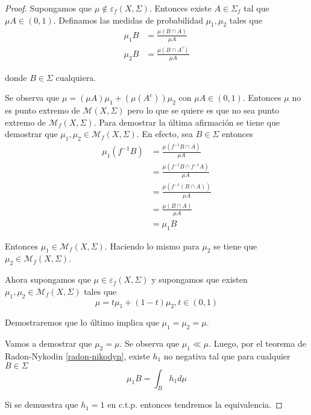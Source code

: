 \begin{proof}
	Supongamos que $\mu \notin \varepsilon_f(X,\Sigma)$. Entonces existe $A \in \Sigma_f$ tal que $\mu A \in (0,1)$. Definamos las medidas de probabilidad $\mu_1,\mu_2$ tales que
	\begin{align}
		\mu_1 B &= \frac{\mu(B \cap A)}{\mu A}\\
		\mu_2 B &= \frac{\mu(B \cap A^c)}{\mu A}
	\end{align}
	
	donde $B \in \Sigma$ cualquiera.
	
	Se observa que $\mu = (\mu A) \mu_1 + (\mu(A^c)) \mu_2$ con $\mu A \in (0,1)$. Entonces $\mu$ no es punto extremo de $\mathcal{M}(X,\Sigma)$ pero lo que se quiere es que no sea punto extremo de $\mathcal{M}_f(X,\Sigma)$. Para demostrar la última afirmación se tiene que demostrar que $\mu_1,\mu_2 \in \mathcal{M}_f(X,\Sigma)$. En efecto, sea $B \in \Sigma$ entonces
	\begin{align}
		\mu_1(f^{-1}B) &= \frac{\mu(f^{-1}B \cap A)}{\mu A}\\
		&= \frac{\mu(f^{-1}B \cap f^{-1}A)}{\mu A}\\
		&= \frac{\mu(f^{-1}(B \cap A))}{\mu A}\\
		&= \frac{\mu (B \cap A)}{\mu A}\\		
		&= \mu_1 B
	\end{align}
	
	Entonces $\mu_1 \in \mathcal{M}_f(X,\Sigma)$. Haciendo lo mismo para $\mu_2$ se tiene que\\
	$\mu_2 \in \mathcal{M}_f(X,\Sigma)$.
	
	Ahora supongamos que $\mu \in \varepsilon_f(X,\Sigma)$ y supongamos que existen\\
	$\mu_1,\mu_2 \in \mathcal{M}_f(X,\Sigma)$ tales que
	\begin{equation}
		\mu = t\mu_1 + (1-t)\mu_2, t \in (0,1)
	\end{equation}
	
	Demostraremos que lo último implica que $\mu_1=\mu_2=\mu$. 
	
	Vamos a demostrar que $\mu_2=\mu$. Se observa que $\mu_1 \ll \mu$. Luego, por el teorema de Radon-Nykodin \ref{radon-nikodyn}, existe $h_1$ no negativa tal que para cualquier $B \in \Sigma$
	\begin{equation}
		\mu_1 B = \int_B h_1 d\mu
	\end{equation}
	
	Si se demuestra que $h_1 = 1$ en c.t.p. entonces tendremos la equivalencia.
	

\end{proof}
